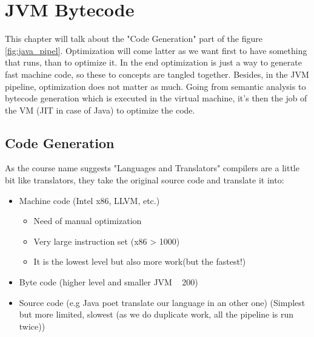 \chapter{JVM Bytecode}
\label{chap:JVM_bytecode}
This chapter will talk about the "Code Generation" part of the figure
\ref{fig:java_pipel}. Optimization will come latter as we want first to have
something that runs, than to optimize it. In the end optimization is just a way
to generate fast machine code, so these to concepts are tangled together.
Besides, in the JVM pipeline, optimization does not matter as much. Going from
semantic analysis to bytecode generation which is executed in the virtual
machine, it's then the job of the VM (JIT in case of Java) to optimize the code.

\section{Code Generation}
As the course name suggests "Languages and Translators" compilers are a little
bit like translators, they take the original source code and translate it into:
\begin{itemize}
    \item Machine code (Intel x86, LLVM, etc.)
    \begin{itemize}
        \item Need of manual optimization
        \item Very large instruction set (x86 > 1000)
        \item It is the lowest level but also more work(but the fastest!)
    \end{itemize}
    \item Byte code (higher level and smaller JVM ~ 200)
    \item Source code (e.g Java poet translate our language in an other one)
    (Simplest but more limited, slowest (as we do duplicate work, all the pipeline is run twice))
\end{itemize}

